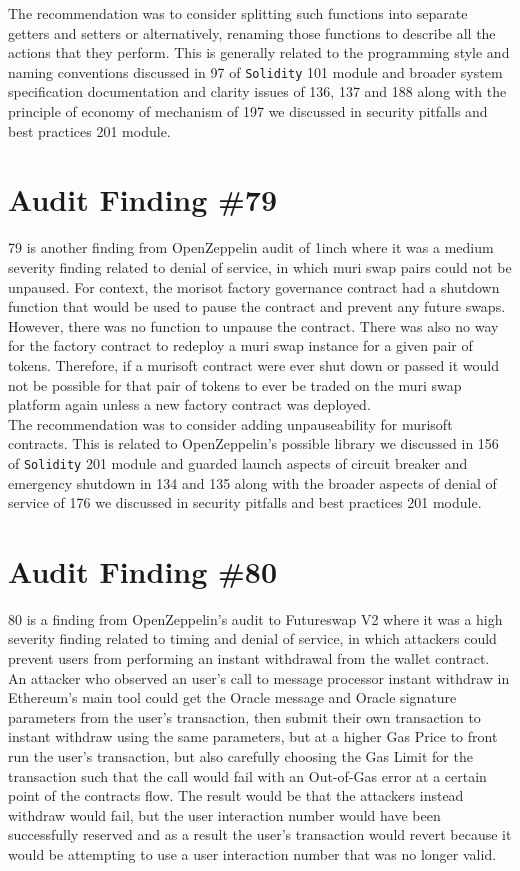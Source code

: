 The recommendation was to consider splitting such functions into separate getters and setters or alternatively, renaming those functions to describe all the actions that they perform. This is generally related to the programming style and naming conventions discussed in 97 of \verb|Solidity| 101 module and broader system specification documentation and clarity issues of 136, 137 and 188 along with the principle of economy of mechanism of 197 we discussed in security pitfalls and best practices 201 module.

\section{Audit Finding \#79}

79 is another finding from OpenZeppelin audit of 1inch where it was a medium severity finding related to denial of service, in which muri swap pairs could not be unpaused. For context, the morisot factory governance contract had a shutdown function that would be used to pause the contract and prevent any future swaps. However, there was no function to unpause the contract. There was also no way for the factory contract to redeploy a muri swap instance for a given pair of tokens. Therefore, if a murisoft contract were ever shut down or passed it would not be possible for that pair of tokens to ever be traded on the muri swap platform again unless a new factory contract was deployed.\\

The recommendation was to consider adding unpauseability for murisoft contracts. This is related to OpenZeppelin's possible library we discussed in 156 of \verb|Solidity| 201 module and guarded launch aspects of circuit breaker and emergency shutdown in 134 and 135 along with the broader aspects of denial of service of 176 we discussed in security pitfalls and best practices 201 module.

\section{Audit Finding \#80}

80 is a finding from OpenZeppelin's audit to Futureswap V2 where it was a high severity finding related to timing and denial of service, in which attackers could prevent users from performing an instant withdrawal from the wallet contract. An attacker who observed an user's call to message processor instant withdraw in Ethereum's main tool could get the Oracle message and Oracle signature parameters from the user's transaction, then submit their own transaction to instant withdraw using the same parameters, but at a higher Gas Price to front run the user's transaction, but also carefully choosing the Gas Limit for the transaction such that the call would fail with an Out-of-Gas error at a certain point of the contracts flow. The result would be that the attackers instead withdraw would fail, but the user interaction number would have been successfully reserved and as a result the user's transaction would revert because it would be attempting to use a user interaction number that was no longer valid.\\

